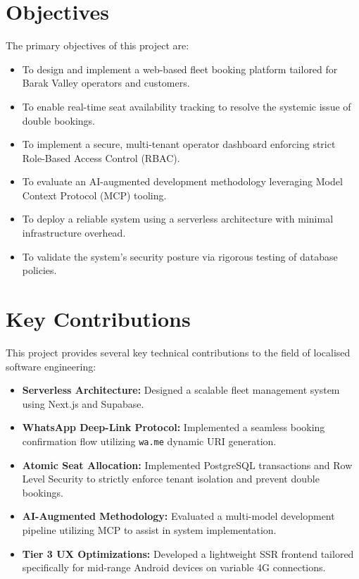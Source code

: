 \documentclass[12pt, a4paper, oneside]{report}
\begin{document}
\section{Objectives}
The primary objectives of this project are:
\begin{itemize}[leftmargin=*]
    \item To design and implement a web-based fleet booking platform tailored for Barak Valley operators and customers.
    \item To enable real-time seat availability tracking to resolve the systemic issue of double bookings.
    \item To implement a secure, multi-tenant operator dashboard enforcing strict Role-Based Access Control (RBAC).
    \item To evaluate an AI-augmented development methodology leveraging Model Context Protocol (MCP) tooling.
    \item To deploy a reliable system using a serverless architecture with minimal infrastructure overhead.
    \item To validate the system's security posture via rigorous testing of database policies.
\end{itemize}

\section{Key Contributions}
This project provides several key technical contributions to the field of localised software engineering:
\begin{itemize}[leftmargin=*]
    \item \textbf{Serverless Architecture:} Designed a scalable fleet management system using Next.js and Supabase.
    \item \textbf{WhatsApp Deep-Link Protocol:} Implemented a seamless booking confirmation flow utilizing \texttt{wa.me} dynamic URI generation.
    \item \textbf{Atomic Seat Allocation:} Implemented PostgreSQL transactions and Row Level Security to strictly enforce tenant isolation and prevent double bookings.
    \item \textbf{AI-Augmented Methodology:} Evaluated a multi-model development pipeline utilizing MCP to assist in system implementation.
    \item \textbf{Tier 3 UX Optimizations:} Developed a lightweight SSR frontend tailored specifically for mid-range Android devices on variable 4G connections.
\end{itemize}
\end{document}
